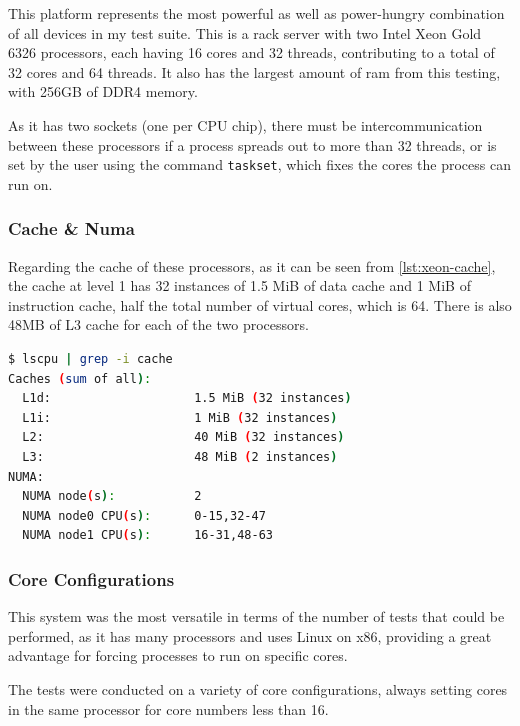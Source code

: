 This platform represents the most powerful as well as power-hungry combination of all devices in my test suite. This is a rack server with two Intel Xeon Gold 6326 processors, each having 16 cores and 32 threads, contributing to a total of 32 cores and 64 threads. It also has the largest amount of \gls{ram} from this testing, with 256GB of \gls{DDR4} memory.

As it has two sockets (one per CPU chip), there must be intercommunication between these processors if a process spreads out to more than 32 threads, or is set by the user using the command \texttt{taskset}, which fixes the cores the process can run on.


\subsubsection{Cache \& Numa}
Regarding the cache of these processors, as it can be seen from \autoref{lst:xeon-cache}, the cache at level 1 has 32 instances of 1.5 MiB of data cache and 1 MiB of instruction cache, half the total number of virtual cores, which is 64. There is also 48MB of L3 cache for each of the two processors.

\begin{lstlisting}[language=bash, caption={Cache of the Intel Xeon Gold 6326}, label={lst:xeon-cache}]
$ lscpu | grep -i cache
Caches (sum of all):
  L1d:                    1.5 MiB (32 instances)
  L1i:                    1 MiB (32 instances)
  L2:                     40 MiB (32 instances)
  L3:                     48 MiB (2 instances)
NUMA:
  NUMA node(s):           2
  NUMA node0 CPU(s):      0-15,32-47
  NUMA node1 CPU(s):      16-31,48-63
\end{lstlisting}

\subsubsection{Core Configurations}

This system was the most versatile in terms of the number of tests that could be performed, as it has many processors and uses Linux on x86, providing a great advantage for forcing processes to run on specific cores.

The tests were conducted on a variety of core configurations, always setting cores in the same processor for core numbers less than 16.

